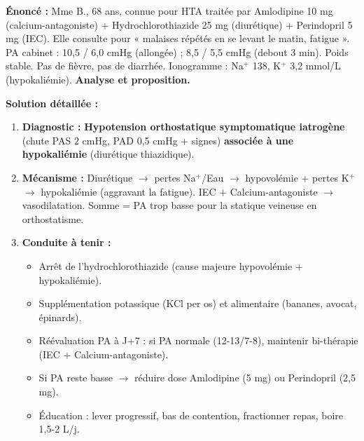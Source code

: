 \documentclass[11pt]{article}
\begin{document}
\begin{exoresolu}
\textbf{Énoncé :} Mme B., 68 ans, connue pour HTA traitée par Amlodipine 10 mg (calcium-antagoniste) + Hydrochlorothiazide 25 mg (diurétique) + Perindopril 5 mg (IEC). Elle consulte pour « malaises répétés en se levant le matin, fatigue ». PA cabinet : 10,5 / 6,0 cmHg (allongée) ; 8,5 / 5,5 cmHg (debout 3 min). Poids stable. Pas de fièvre, pas de diarrhée. Ionogramme : Na$^+$ 138, K$^+$ 3,2 mmol/L (hypokaliémie).
\textbf{Analyse et proposition.}

\textbf{Solution détaillée :}
\begin{enumerate}
    \item \textbf{Diagnostic :} \textbf{Hypotension orthostatique symptomatique iatrogène} (chute PAS 2 cmHg, PAD 0,5 cmHg + signes) \textbf{associée à une hypokaliémie} (diurétique thiazidique).
    \item \textbf{Mécanisme :} Diurétique $\rightarrow$ pertes Na$^+$/Eau $\rightarrow$ hypovolémie + pertes K$^+$ $\rightarrow$ hypokaliémie (aggravant la fatigue). IEC + Calcium-antagoniste $\rightarrow$ vasodilatation. Somme = PA trop basse pour la statique veineuse en orthostatisme.
    \item \textbf{Conduite à tenir :}
    \begin{itemize}
        \item Arrêt de l'hydrochlorothiazide (cause majeure hypovolémie + hypokaliémie).
        \item Supplémentation potassique (KCl per os) et alimentaire (bananes, avocat, épinards).
        \item Réévaluation PA à J+7 : si PA normale (12-13/7-8), maintenir bi-thérapie (IEC + Calcium-antagoniste).
        \item Si PA reste basse $\rightarrow$ réduire dose Amlodipine (5 mg) ou Perindopril (2,5 mg).
        \item Éducation : lever progressif, bas de contention, fractionner repas, boire 1,5-2 L/j.
    \end{itemize}
\end{enumerate}
\end{exoresolu}
\end{document}
